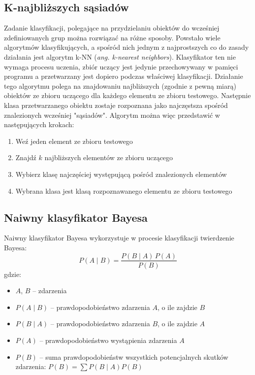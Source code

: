 \documentclass{classrep}
\begin{document}
{        \subsection{K-najbliższych sąsiadów}
        \label{knn_intro} {
            Zadanie klasyfikacji, polegające na przydzielaniu obiektów do wcześniej
            zdefiniowanych grup
            można rozwiązać na różne sposoby. Powstało wiele algorytmów
            klasyfikujących, a spośród nich
            jednym z najprostszych co do zasady działania jest algorytm
            k-NN (\emph{ang. k-nearest neighbors}).
            Klasyfikator ten nie wymaga procesu uczenia, zbiór uczący jest jedynie
            przechowywany w pamięci
            programu a przetwarzany jest dopiero podczas właściwej klasyfikacji.
            Działanie tego algorytmu polega
            na znajdowaniu najbliższych (zgodnie z pewną miarą) obiektów ze zbioru
            uczącego dla każdego elementu
            ze zbioru testowego. Następnie klasa przetwarzanego obiektu zostaje
            rozpoznana jako najczęstsza spośród
            znalezionych wcześniej "sąsiadów". Algorytm można więc przedstawić w
            następujących krokach:
            \begin{enumerate}
                \item Weź jeden element ze zbioru testowego
                \item Znajdź $k$ najbliższych elementów ze zbioru uczącego
                \item Wybierz klasę najczęściej występującą pośród znalezionych elementów
                \item Wybrana klasa jest klasą rozpoznawanego elementu ze zbioru testowego
            \end{enumerate}
        }

        \subsection{Naiwny klasyfikator Bayesa}
        \label{bayes_intro} {
            Naiwny klasyfikator Bayesa wykorzystuje w procesie klasyfikacji twierdzenie Bayesa:
            $$ P(A \mid B) = \frac{P(B \mid A) \, P(A)}{P(B)} $$
            gdzie:
            \begin{itemize}
                \item $A$, $B$ -- zdarzenia
                \item $P(A \mid B)$ -- prawdopodobieństwo zdarzenia $A$, o ile zajdzie $B$
                \item $P(B \mid A)$ -- prawdopodobieństwo zdarzenia $B$, o ile zajdzie $A$
                \item $P(A)$ -- prawdopodobieństwo wystąpienia zdarzenia $A$
                \item $P(B)$ -- suma prawdopodobieństw wszystkich potencjalnych skutków zdarzenia: $P(B)=\sum P(B\mid A)P(B)$
            \end{itemize}
            
}}
\end{document}
